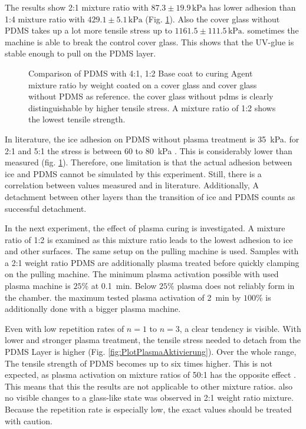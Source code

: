 The results show 2:1 mixture ratio with $87.3\pm19.9\,\si{\kilo\pascal}$ has lower adhesion than 1:4 mixture ratio with $429.1\pm5.1\,\si{\kilo\pascal}$ (Fig. \ref{fig:vgl4:1zu1:2zuGlas}). Also the cover glass without PDMS takes up a lot more tensile stress up to $1161.5\pm111.5\,\si{\kilo\pascal}$. sometimes the machine is able to break the control cover glass. This shows that the UV-glue is stable enough to pull on the PDMS layer.


\begin{figure}[hbt!]
	\centering	
	
	\caption{Comparison of PDMS with 4:1, 1:2 Base coat to curing Agent mixture ratio by weight coated on a cover glass and cover glass without PDMS as reference. the cover glass without pdms is clearly distinguishable by higher tensile stress. A mixture ratio of 1:2 shows the lowest tensile strength.}
	\label{fig:vgl4:1zu1:2zuGlas}
\end{figure}


In literature, the ice adhesion on PDMS without plasma treatment is \SI{35}{\kilo\pascal}. for 2:1 and 5:1 the stress is between $60$ to \SI{80}{\kilo\pascal} \cite{IbanezIbanez.2022}. This is considerably lower than measured (fig. \ref{fig:vgl4:1zu1:2zuGlas}). Therefore, one limitation is that the actual adhesion between ice and PDMS cannot be simulated by this experiment. Still, there is a correlation between values measured and in literature. Additionally, A detachment between other layers than the transition of ice and PDMS counts as successful detachment. 

In the next experiment, the effect of plasma curing is investigated. A mixture ratio of 1:2 is examined as this mixture ratio leads to the lowest adhesion to ice and other surfaces. The same setup on the pulling machine is used. Samples with a 2:1 weight ratio PDMS are additionally plasma treated before quickly clamping on the pulling machine. The minimum plasma activation possible with used plasma machine is $25\%$ at \SI{0.1}{\minute}. Below $25\%$ plasma does not reliably form in the chamber. the maximum tested plasma activation of \SI{2}{\minute} by $100\%$ is additionally done with a bigger plasma machine.

Even with low repetition rates of $n = 1$ to $ n =3$, a clear tendency is visible. With lower and stronger plasma treatment, the tensile stress needed to detach from the PDMS Layer is higher (Fig. \ref{fig:PlotPlasmaAktivierung}). Over the whole range, The tensile strength of PDMS becomes up to six times higher. This is not expected, as plasma activation on mixture ratios of 50:1 has the opposite effect \cite{Ohishi.2017}. This means that this the results are not applicable to other mixture ratios. also no visible changes to a glass-like state was observed in 2:1 weight ratio mixture. Because the repetition rate is especially low, the exact values should be treated with caution. 

